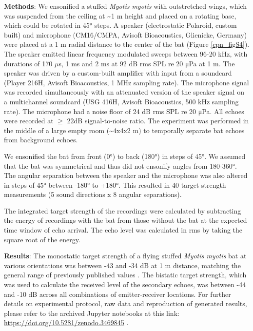 \documentclass[
]{book}
\begin{document}
\textbf{Methods}: We ensonified a stuffed \emph{Myotis myotis} with outstretched wings, which was suspended from the ceiling at \textasciitilde1 m height and placed on a rotating base, which could be rotated in 45° steps. A speaker (electrostatic Polaroid, custom built) and microphone (CM16/CMPA, Avisoft Bioacoustics, Glienicke, Germany) were placed at a 1 m radial distance to the center of the bat (Figure \ref{cpn_figS4}). The speaker emitted linear frequency modulated sweeps between 96-20 kHz, with durations of 170 \(\mu\)s, 1 ms and 2 ms at 92 dB rms SPL re 20 μPa at 1 m. The speaker was driven by a custom-built amplifier with input from a soundcard (Player 216H, Avisoft Bioacoustics, 1 MHz sampling rate). The microphone signal was recorded simultaneously with an attenuated version of the speaker signal on a multichannel soundcard (USG 416H, Avisoft Bioacoustics, 500 kHz sampling rate). The microphone had a noise floor of 24 dB rms SPL re 20 μPa. All echoes were recorded at \(\geq\) 22dB signal-to-noise ratio. The experiment was performed in the middle of a large empty room (\textasciitilde4x4x2 m) to temporally separate bat echoes from background echoes.

We ensonified the bat from front (0°) to back (180°) in steps of 45°. We assumed
that the bat was symmetrical and thus did not ensonify angles from 180-360°. The
angular separation between the speaker and the microphone was also altered in
steps of 45° between -180° to +180°. This resulted in 40 target strength
measurements (5 sound directions x 8 angular separations).

The integrated target strength \citep{j1985a} of the recordings were calculated by subtracting the energy of recordings with the bat from those without the bat at the expected time window of echo arrival. The echo level was calculated in rms by taking the square root of the energy.

\textbf{Results}: The monostatic target strength of a flying stuffed \emph{Myotis myotis} bat at various orientations was between -43 and -34 dB at 1 m distance, matching the general range of previously published values \citep{goetze2016a}. The bistatic target strength, which was used to calculate the received level of the secondary echoes, was between -44 and -10 dB across all combinations of emitter-receiver locations. For further details on experimental protocol, raw data and reproduction of generated results, please refer to the archived Jupyter notebooks at this link: \url{https://doi.org/10.5281/zenodo.3469845} .
\end{document}
